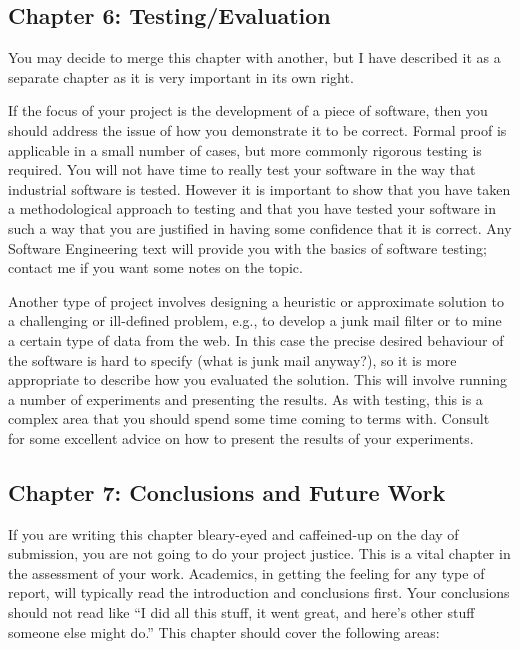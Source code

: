 \documentclass[]{final_report}
\begin{document}
\subsection{Chapter 6: Testing/Evaluation}

You may decide to merge this chapter with another, but I have described it as a separate chapter as it is very important in its own right.

If the focus of your project is the development of a piece of software, then you should address the issue of how you demonstrate it to be correct. Formal proof is applicable in a small number of cases, but more commonly rigorous testing is required. You will not have time to really test your software in the way that industrial software is tested. However it is important to show that you have taken a methodological approach to testing and that you have tested your software in such a way that you are justified in having some confidence that it is correct. Any Software Engineering text will provide you with the basics of software testing; contact me if you want some notes on the topic.

Another type of project involves designing a heuristic or approximate solution to a challenging or ill-defined problem, e.g., to develop a junk mail filter or to mine a certain type of data from the web. In this case the precise desired behaviour of the software is hard to specify (what is junk mail anyway?), so it is more appropriate to describe how you evaluated the solution. This will involve running a number of experiments and presenting the results. As with testing, this is a complex area that you should spend some time coming to terms with. Consult~\cite{DAWSON:2000} for some excellent advice on how to present the results of your experiments.


\subsection{Chapter 7: Conclusions and Future Work}

If you are writing this chapter bleary-eyed and caffeined-up on the day of submission, you are not going to do your project justice. This is a vital chapter in the assessment of your work. Academics, in getting the feeling for any type of report, will typically read the introduction and conclusions first. Your conclusions should not read like ``I did all this stuff, it went great, and here's other stuff someone else might do.'' This chapter should cover the following areas:
\end{document}
